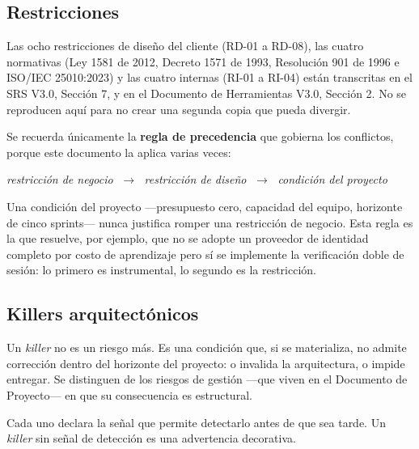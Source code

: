 \documentclass[11pt,a4paper]{article}
\begin{document}
\subsection{Restricciones}

Las ocho restricciones de diseño del cliente (RD-01 a RD-08), las cuatro normativas (Ley 1581 de 2012, Decreto 1571 de 1993, Resolución 901 de 1996 e ISO/IEC 25010:2023) y las cuatro internas (RI-01 a RI-04) están transcritas en el SRS V3.0, Sección 7, y en el Documento de Herramientas V3.0, Sección 2. No se reproducen aquí para no crear una segunda copia que pueda divergir.

Se recuerda únicamente la \textbf{regla de precedencia} que gobierna los conflictos, porque este documento la aplica varias veces:

\begin{center}
\textit{restricción de negocio} $\;\rightarrow\;$ \textit{restricción de diseño} $\;\rightarrow\;$ \textit{condición del proyecto}
\end{center}

\noindent Una condición del proyecto ---presupuesto cero, capacidad del equipo, horizonte de cinco sprints--- nunca justifica romper una restricción de negocio. Esta regla es la que resuelve, por ejemplo, que no se adopte un proveedor de identidad completo por costo de aprendizaje pero sí se implemente la verificación doble de sesión: lo primero es instrumental, lo segundo es la restricción.

\subsection{Killers arquitectónicos}

Un \emph{killer} no es un riesgo más. Es una condición que, si se materializa, no admite corrección dentro del horizonte del proyecto: o invalida la arquitectura, o impide entregar. Se distinguen de los riesgos de gestión ---que viven en el Documento de Proyecto--- en que su consecuencia es estructural.

Cada uno declara la señal que permite detectarlo antes de que sea tarde. Un \emph{killer} sin señal de detección es una advertencia decorativa.
\end{document}
